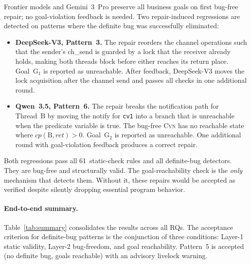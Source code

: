 \documentclass[sigconf]{acmart}
\begin{document}
Frontier models and Gemini~3~Pro preserve all business goals on first bug-free repair; no goal-violation feedback is needed. Two repair-induced regressions are detected on patterns where the definite bug was successfully eliminated:

\begin{itemize}[leftmargin=1.4em]
  \item \textbf{DeepSeek-V3, Pattern~3.}
    The repair reorders the channel operations such that the sender's \textsf{ch\_send} is guarded by a lock
    that the receiver already holds, making both threads block before either reaches its return place. Goal~G$_1$ is reported as unreachable. After feedback, DeepSeek-V3 moves the lock acquisition after the channel send and passes all checks in one additional round.

  \item \textbf{Qwen~3.5, Pattern~6.}
    The repair breaks the notification path for Thread~B by moving the \textsf{notify} for \texttt{cv1} into a
    branch that is unreachable when the predicate variable is true. The bug-free \textsc{Cvn} has no reachable state where $\mathit{cp}(\text{B},\mathit{ret})>0$. Goal~G$_2$ is reported as unreachable. One additional round with goal-violation feedback produces a correct repair.
\end{itemize}

Both regressions pass all 61~static-check rules and all definite-bug detectors. They are bug-free and structurally valid. The goal-reachability check is the \emph{only} mechanism that detects them. Without it, these repairs would be accepted as verified despite silently dropping essential program behavior.



\paragraph{End-to-end summary.}
Table~\ref{tab:summary} consolidates the results across all RQs. The acceptance criterion for definite-bug patterns is the conjunction of three conditions: Layer-1 static validity, Layer-2 bug-freedom, and goal reachability. Pattern~5 is accepted (no definite bug, goals reachable) with an advisory livelock warning.
\end{document}
